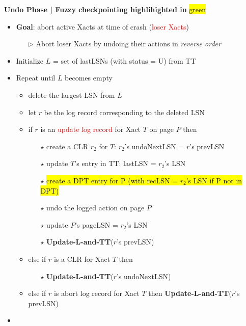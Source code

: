 \documentclass[10pt,landscape]{article}
\newcommand{\1}{\mathmybb{1}}
\begin{document}
\begin{multicols*}{3}
\textbf{Undo Phase | Fuzzy checkpointing highlihighted in} \hl{green}
\begin{itemize}
    \item \textbf{Goal}: abort active Xacts at time of crash (\textcolor{red}{loser Xacts})
    \begin{itemize}
        \item[$\triangleright$] Abort loser Xacts by undoing their actions in \textit{reverse order}
    \end{itemize}
    \item Initialize $L$ = set of lastLSNs (with status = U) from TT
    \item Repeat until $L$ becomes empty
    \begin{itemize}
        \item delete the largest LSN from $L$
        \item let $r$ be the log record corresponding to the deleted LSN
        \item if $r$ is an \textcolor{red}{update log record} for Xact $T$ on page $P$ then
        \begin{itemize}
            \item[$\star$] create a CLR $r_2$ for $T$: $r_2$'s undoNextLSN = $r$'s prevLSN
            \item[$\star$] update $T$'s entry in TT: lastLSN = $r_2$'s LSN
            \item[$\star$] \hl{create a DPT entry for P (with recLSN = $r_2$'s LSN if P not in DPT)}
            \item[$\star$] undo the logged action on page $P$
            \item[$\star$] update $P$'s pageLSN = $r_2$'s LSN
            \item[$\star$] \textbf{Update-L-and-TT}($r$'s prevLSN)
        \end{itemize}
        \item else if $r$ is a CLR for Xact $T$ then
        \begin{itemize}
            \item[$\star$] \textbf{Update-L-and-TT}($r$'s undoNextLSN)
        \end{itemize}
        \item else if $r$ is abort log record for Xact $T$ then \textbf{Update-L-and-TT}($r$'s prevLSN)
    \end{itemize}
    \item {}
\end{itemize}


\end{multicols*}
\end{document}
